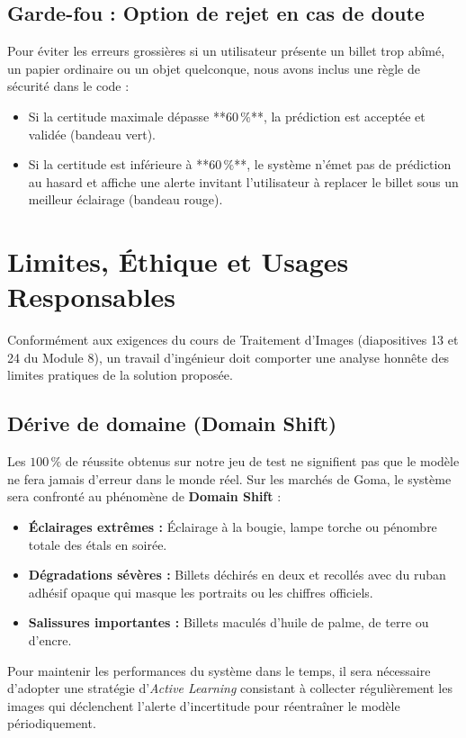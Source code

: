 \documentclass[11pt,a4paper]{article}
\begin{document}
\subsection{Garde-fou : Option de rejet en cas de doute}
Pour éviter les erreurs grossières si un utilisateur présente un billet trop abîmé, un papier ordinaire ou un objet quelconque, nous avons inclus une règle de sécurité dans le code :
\begin{itemize}
    \item Si la certitude maximale dépasse **$60\,\%$**, la prédiction est acceptée et validée (bandeau vert).
    \item Si la certitude est inférieure à **$60\,\%$**, le système n'émet pas de prédiction au hasard et affiche une alerte invitant l'utilisateur à replacer le billet sous un meilleur éclairage (bandeau rouge).
\end{itemize}

\newpage
\section{Limites, Éthique et Usages Responsables}

Conformément aux exigences du cours de Traitement d'Images (diapositives 13 et 24 du Module 8), un travail d'ingénieur doit comporter une analyse honnête des limites pratiques de la solution proposée.

\subsection{Dérive de domaine (Domain Shift)}
Les $100\,\%$ de réussite obtenus sur notre jeu de test ne signifient pas que le modèle ne fera jamais d'erreur dans le monde réel. Sur les marchés de Goma, le système sera confronté au phénomène de \textbf{Domain Shift} :
\begin{itemize}
    \item \textbf{Éclairages extrêmes :} Éclairage à la bougie, lampe torche ou pénombre totale des étals en soirée.
    \item \textbf{Dégradations sévères :} Billets déchirés en deux et recollés avec du ruban adhésif opaque qui masque les portraits ou les chiffres officiels.
    \item \textbf{Salissures importantes :} Billets maculés d'huile de palme, de terre ou d'encre.
\end{itemize}
Pour maintenir les performances du système dans le temps, il sera nécessaire d'adopter une stratégie d'\textit{Active Learning} consistant à collecter régulièrement les images qui déclenchent l'alerte d'incertitude pour réentraîner le modèle périodiquement.
\end{document}
